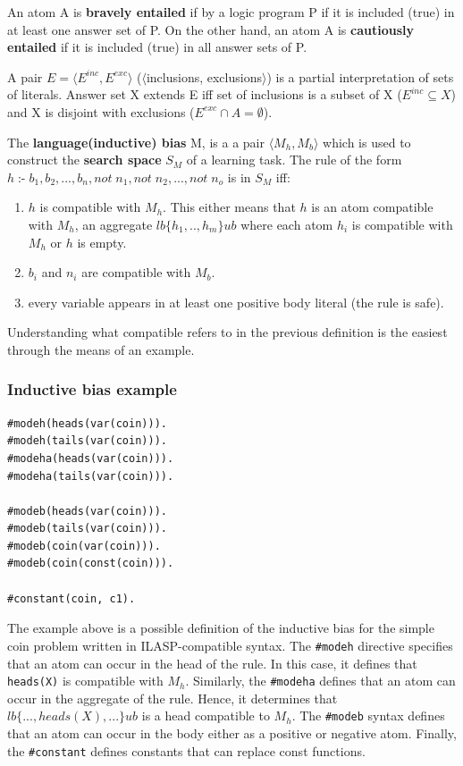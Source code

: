 An atom A is \textbf{bravely entailed} if by a logic program P if it is included (true) in at least one answer set of P. 
On the other hand, an atom A is \textbf{cautiously entailed} if it is included (true) in all answer sets of P.

A pair $E = \langle E^{inc}, E^{exc} \rangle $ ($\langle$inclusions, exclusions$\rangle$) is a partial interpretation of sets of literals.
Answer set X extends E iff set of inclusions is a subset of X ($E^{inc} \subseteq X$) and X is disjoint with exclusions ($E^{exc} \cap A = \emptyset$).


The \textbf{language(inductive) bias} M, is a a pair $\langle M_h, M_b \rangle$ which is used to construct the \textbf{search space} $S_M$ of a learning task.
The rule of the form  \\$ h \;\text{:-} \; b_1, b_2, ..., b_n, not\; n_1, not\; n_2, ..., not\; n_o$ is in $S_M$ iff:
\begin{enumerate}
    \item $h$ is compatible with $M_h$. This either means that $h$ is an atom compatible with $M_h$, an aggregate $lb\{h_1,.., h_m\}ub$ where each atom $h_i$ is compatible with $M_h$ or $h$ is empty.
    \item $b_i$ and $n_i$ are compatible with $M_b$.
    \item every variable appears in at least one positive body literal (the rule is safe). \\ 
\end{enumerate}
Understanding what compatible refers to in the previous definition is the easiest through the means of an example.

\subsubsection{Inductive bias example}
\begin{verbatim}
#modeh(heads(var(coin))).
#modeh(tails(var(coin))).
#modeha(heads(var(coin))).
#modeha(tails(var(coin))).

#modeb(heads(var(coin))).
#modeb(tails(var(coin))).
#modeb(coin(var(coin))).
#modeb(coin(const(coin))).

#constant(coin, c1).
\end{verbatim}

The example above is a possible definition of the inductive bias for the simple coin problem written in ILASP-compatible syntax.
The \verb+#modeh+ directive specifies that an atom can occur in the head of the rule. In this case, it defines that \verb+heads(X)+ is compatible with $M_h$.
Similarly, the \verb+#modeha+ defines that an atom can occur in the aggregate of the rule. Hence, it determines that  $lb\{..., heads(X), ...\}ub$ is a head compatible to $M_h$.
The \verb+#modeb+ syntax defines that an atom can occur in the body either as a positive or negative atom.
Finally, the \verb+#constant+ defines constants that can replace const functions.

